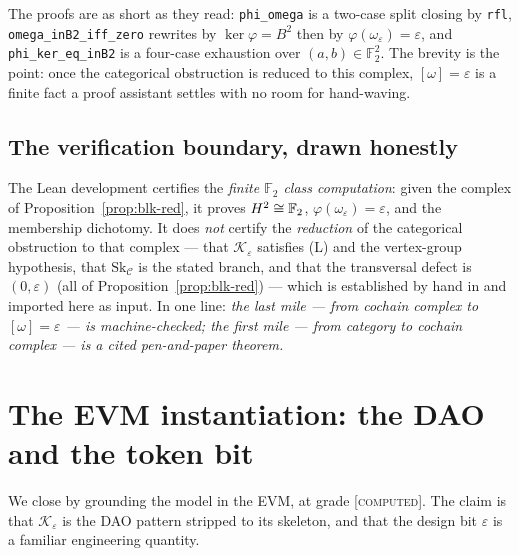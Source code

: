 The proofs are as short as they read: \texttt{phi\_omega} is a two-case split closing by
\texttt{rfl}, \texttt{omega\_inB2\_iff\_zero} rewrites by $\ker\varphi=B^2$ then by
$\varphi(\omega_\varepsilon)=\varepsilon$, and \texttt{phi\_ker\_eq\_inB2} is a four-case
exhaustion over $(a,b)\in\mathbb{F}_2^2$. The brevity is the point: once the categorical
obstruction is reduced to this complex, $[\omega]=\varepsilon$ is a finite fact a proof
assistant settles with no room for hand-waving.

\subsection*{The verification boundary, drawn honestly}

The Lean development certifies the \emph{finite $\mathbb{F}_2$ class computation}: given the
complex of Proposition~\ref{prop:blk-red}, it proves $H^2\cong\mathbb{F}_2$,
$\varphi(\omega_\varepsilon)=\varepsilon$, and the membership dichotomy. It does \emph{not}
certify the \emph{reduction} of the categorical obstruction to that complex --- that
$\mathcal K_\varepsilon$ satisfies (L) and the vertex-group hypothesis, that
$\mathrm{Sk}_{\mathcal C}$ is the stated branch, and that the transversal defect is
$(0,\varepsilon)$ (all of Proposition~\ref{prop:blk-red}) --- which is established by hand in
\cite{macbeth-reduction} and imported here as input. In one line: \emph{the last mile ---
from cochain complex to $[\omega]=\varepsilon$ --- is machine-checked; the first mile ---
from category to cochain complex --- is a cited pen-and-paper theorem.}


\section{The EVM instantiation: the DAO and the token bit}
\label{sec:blk-evm}

We close by grounding the model in the EVM, at grade \textsc{[computed]}. The claim is that
$\mathcal K_\varepsilon$ is the DAO pattern stripped to its skeleton, and that the design
bit $\varepsilon$ is a familiar engineering quantity.

